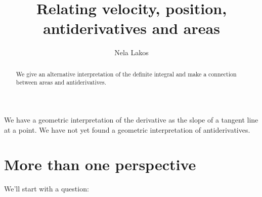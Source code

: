\documentclass{ximera}
\author{Nela Lakos}
\title[Dig-In:]{Relating velocity, position, antiderivatives and areas}
\begin{document}
\begin{abstract}
We give an alternative interpretation of the definite integral and make a connection between  areas and antiderivatives.
\end{abstract}
\maketitle

 We have a
geometric interpretation of the derivative as the slope of a tangent
line at a point.  We have not yet found a geometric interpretation of
antiderivatives.


\section{More than one perspective}

We'll start with a question:
\end{document}
